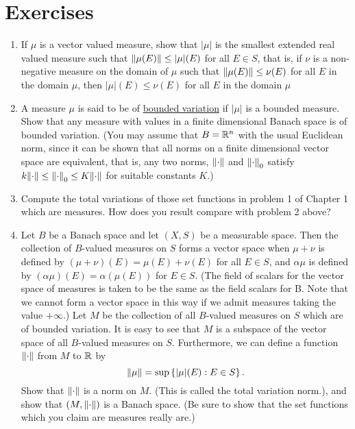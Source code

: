 \section{Exercises}
\begin{enumerate}[label=\arabic*)]

\item If $\mu$ is a vector valued measure, show that $|\mu|$ is the smallest extended real valued measure such that $\norm{\mu(E)}\leq|\mu|(E)$ for all $E \in S$, that is, if $\nu$ is a non-negative measure on the domain of $\mu$ such that $\norm{\mu(E)}\leq\nu(E)$ for all $E$ in the domain $\mu$, then $|\mu|(E)\leq\nu(E)$ for all $E$ in the domain $\mu$

\item A measure $\mu$ is said to be of \underline{bounded variation} if $|\mu|$ is a bounded measure. Show that any measure with values in a finite dimensional Banach space is of bounded variation. (You may assume that $B=\mathbb{R}^n$ with the usual Euclidean norm, since it can be shown that all norms on a finite dimensional vector space are equivalent, that is, any two norms, $\norm{\cdot}$ and $\norm{\cdot}_0$ satisfy $k\norm{\cdot}\leq\norm{\cdot}_0\leq K\norm{\cdot}$ for suitable constants $K$.)

\item Compute the total variations of those set functions in problem 1 of Chapter 1 which are measures. How does you result compare with problem 2 above?

\item Let $B$ be a Banach space and let $(X, S)$ be a measurable space. Then the collection of $B$-valued measures on $S$ forms a vector space when $\mu+\nu$ is defined by $(\mu+\nu)(E)=\mu(E)+\nu(E)$ for all $E \in S$, and $\alpha\mu$ is defined by $(\alpha \mu)(E)=\alpha(\mu(E))$ for $E \in S$. (The field of scalars for the vector space of measures is taken to be the same as the field scalars for B. Note that we cannot form a vector space in this way if we admit measures taking the value $+\infty$.) Let $M$ be the collection of all $B$-valued measures on $S$ which are of bounded variation. It is easy to see that $M$ is a subspace of the vector space of all $B$-valued measures on $S$. Furthermore, we can define a function $\norm{\cdot}$ from $M$ to $\mathbb{R}$ by $$\norm{\mu}=\sup\left\{|\mu|(E):E\in S\right\}.$$ Show that $\norm{\cdot}$ is a norm on $M$. (This is called the total variation norm.), and show that $(M,\norm{\cdot})$ is a Banach space. (Be sure to show that the set functions which you claim are measures really are.)


\end{enumerate}
